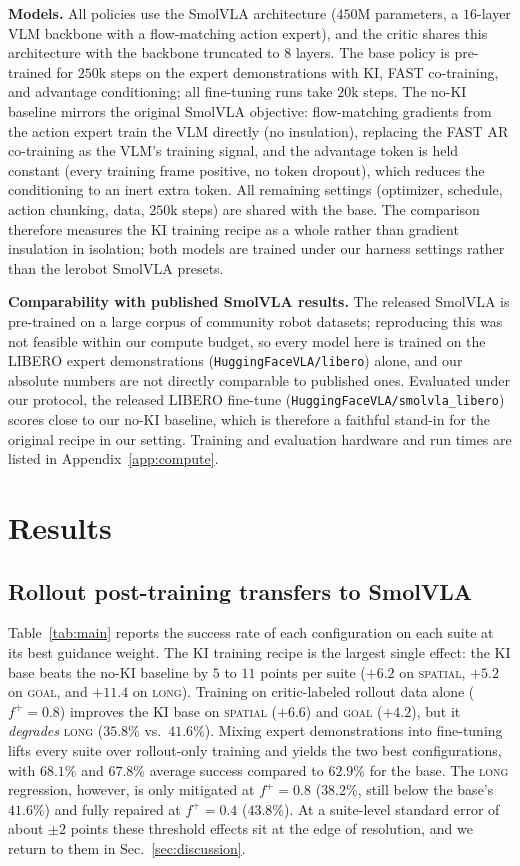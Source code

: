 \documentclass[conference]{IEEEtran}
\newcommand{\pf}{\ensuremath{f^{+}}}   %
\begin{document}
\textbf{Models.} All policies use the SmolVLA architecture ($450$M parameters, a
$16$-layer VLM backbone with a flow-matching action expert), and the critic shares this
architecture with the backbone truncated to $8$ layers. The base policy is pre-trained for
$250$k steps on the expert demonstrations with KI, FAST co-training, and advantage
conditioning; all fine-tuning runs take $20$k steps. The no-KI baseline mirrors the
original SmolVLA objective: flow-matching gradients from the action expert train the VLM
directly (no insulation), replacing the FAST AR co-training as the VLM's training signal,
and the advantage token is held constant (every training frame positive, no token dropout),
which reduces the conditioning to an inert extra token. All remaining settings (optimizer,
schedule, action chunking, data, $250$k steps) are shared with the base. The comparison
therefore measures the KI training recipe as a whole rather than gradient insulation in
isolation; both models are trained under our harness settings rather than the lerobot
SmolVLA presets.

\textbf{Comparability with published SmolVLA results.} The released SmolVLA is pre-trained
on a large corpus of community robot datasets; reproducing this was not feasible within our
compute budget, so every model here is trained on the LIBERO expert demonstrations
(\texttt{HuggingFaceVLA/libero}) alone, and our absolute numbers are not directly
comparable to published ones. Evaluated under our protocol, the released LIBERO fine-tune
(\texttt{HuggingFaceVLA/smolvla\_libero}) scores close to our no-KI baseline, which is
therefore a faithful stand-in for the original recipe in our setting. Training and
evaluation hardware and run times are listed in Appendix~\ref{app:compute}.

\section{Results}
\subsection{Rollout post-training transfers to SmolVLA}\label{sec:main}
Table~\ref{tab:main} reports the success rate of each configuration on each suite at its
best guidance weight. The KI training recipe is the largest single effect: the KI base
beats the no-KI baseline by $5$ to $11$ points per suite ($+6.2$ on \textsc{spatial},
$+5.2$ on \textsc{goal}, and $+11.4$ on \textsc{long}). Training on critic-labeled rollout
data alone ($\pf{=}0.8$) improves the KI base on \textsc{spatial} ($+6.6$) and
\textsc{goal} ($+4.2$), but it \emph{degrades} \textsc{long} ($35.8\%$ vs.\ $41.6\%$).
Mixing expert demonstrations into fine-tuning lifts every suite over rollout-only training
and yields the two best configurations, with $68.1\%$ and $67.8\%$ average success
compared to $62.9\%$ for the base. The \textsc{long} regression, however, is only
mitigated at $\pf{=}0.8$ ($38.2\%$, still below the base's $41.6\%$) and fully repaired at
$\pf{=}0.4$ ($43.8\%$). At a suite-level standard error of about $\pm2$ points these
threshold effects sit at the edge of resolution, and we return to them in
Sec.~\ref{sec:discussion}.
\end{document}
